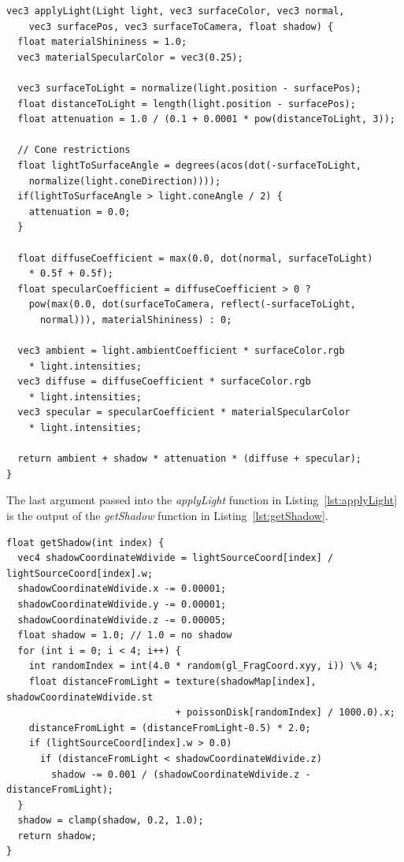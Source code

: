 \documentclass[a4paper,12pt]{article}
\begin{document}
\begin{lstlisting}[label=lst:applyLight,caption= Shader function for applying lighting]
vec3 applyLight(Light light, vec3 surfaceColor, vec3 normal,
    vec3 surfacePos, vec3 surfaceToCamera, float shadow) {
  float materialShininess = 1.0;
  vec3 materialSpecularColor = vec3(0.25);

  vec3 surfaceToLight = normalize(light.position - surfacePos);
  float distanceToLight = length(light.position - surfacePos);
  float attenuation = 1.0 / (0.1 + 0.0001 * pow(distanceToLight, 3));

  // Cone restrictions
  float lightToSurfaceAngle = degrees(acos(dot(-surfaceToLight,
    normalize(light.coneDirection))));
  if(lightToSurfaceAngle > light.coneAngle / 2) {
    attenuation = 0.0;
  }

  float diffuseCoefficient = max(0.0, dot(normal, surfaceToLight)
    * 0.5f + 0.5f);
  float specularCoefficient = diffuseCoefficient > 0 ?
    pow(max(0.0, dot(surfaceToCamera, reflect(-surfaceToLight,
      normal))), materialShininess) : 0;

  vec3 ambient = light.ambientCoefficient * surfaceColor.rgb
    * light.intensities;
  vec3 diffuse = diffuseCoefficient * surfaceColor.rgb
    * light.intensities;
  vec3 specular = specularCoefficient * materialSpecularColor
    * light.intensities;

  return ambient + shadow * attenuation * (diffuse + specular);
}
\end{lstlisting}

\noindent
The last argument passed into the \emph{applyLight} function in Listing~\ref{lst:applyLight} is the output of the \emph{getShadow} function in Listing~\ref{lst:getShadow}.

\begin{minipage}{\textwidth}
\begin{lstlisting}[label=lst:getShadow,caption= The shader function figuring out whether the fragment is in shade.]
float getShadow(int index) {
  vec4 shadowCoordinateWdivide = lightSourceCoord[index] / lightSourceCoord[index].w;
  shadowCoordinateWdivide.x -= 0.00001;
  shadowCoordinateWdivide.y -= 0.00001;
  shadowCoordinateWdivide.z -= 0.00005;
  float shadow = 1.0; // 1.0 = no shadow
  for (int i = 0; i < 4; i++) {
    int randomIndex = int(4.0 * random(gl_FragCoord.xyy, i)) \% 4;
    float distanceFromLight = texture(shadowMap[index], shadowCoordinateWdivide.st
                              + poissonDisk[randomIndex] / 1000.0).x;
    distanceFromLight = (distanceFromLight-0.5) * 2.0;
    if (lightSourceCoord[index].w > 0.0)
      if (distanceFromLight < shadowCoordinateWdivide.z)
        shadow -= 0.001 / (shadowCoordinateWdivide.z - distanceFromLight);
  }
  shadow = clamp(shadow, 0.2, 1.0);
  return shadow;
}
\end{lstlisting}
\end{minipage}
\end{document}

